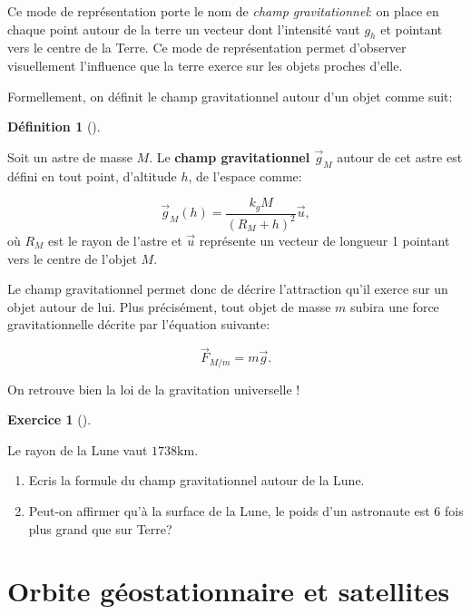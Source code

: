\documentclass[
  letterpaper,
  DIV=11,
  numbers=noendperiod]{scrartcl}
\providecommand{\tightlist}{%
  \setlength{\itemsep}{0pt}\setlength{\parskip}{0pt}}\usepackage{longtable,booktabs,array}
\theoremstyle{definition}
\newtheorem{exercise}{Exercice}[section]
\theoremstyle{definition}
\newtheorem{definition}{Définition}[section]
\theoremstyle{definition}
\theoremstyle{remark}
\begin{document}
Ce mode de représentation porte le nom de \emph{champ gravitationnel}:
on place en chaque point autour de la terre un vecteur dont l'intensité
vaut \(g_h\) et pointant vers le centre de la Terre. Ce mode de
représentation permet d'observer visuellement l'influence que la terre
exerce sur les objets proches d'elle.

Formellement, on définit le champ gravitationnel autour d'un objet comme
suit:

\begin{definition}[]\protect\hypertarget{def-champ}{}\label{def-champ}

Soit un astre de masse \(M\). Le \textbf{champ gravitationnel
\(\overrightarrow{g}_M\)} autour de cet astre est défini en tout point,
d'altitude \(h\), de l'espace comme:

\[
\overrightarrow{g}_M(h) = \frac{k_g M}{(R_M+h)^2} \overrightarrow{u},
\] où \(R_M\) est le rayon de l'astre et \(\overrightarrow{u}\)
représente un vecteur de longueur 1 pointant vers le centre de l'objet
\(M\).

\end{definition}

Le champ gravitationnel permet donc de décrire l'attraction qu'il exerce
sur un objet autour de lui. Plus précisément, tout objet de masse \(m\)
subira une force gravitationnelle décrite par l'équation suivante:

\[
\overrightarrow{F}_{M/m} = m \overrightarrow{g}.
\]

On retrouve bien la loi de la gravitation universelle !

\begin{exercise}[]\protect\hypertarget{exr-champ}{}\label{exr-champ}

Le rayon de la Lune vaut \(1738\text{km}\).

\begin{enumerate}
\def\labelenumi{\arabic{enumi}.}
\tightlist
\item
  Ecris la formule du champ gravitationnel autour de la Lune.
\item
  Peut-on affirmer qu'à la surface de la Lune, le poids d'un astronaute
  est 6 fois plus grand que sur Terre?
\end{enumerate}

\end{exercise}

\section{Orbite géostationnaire et
satellites}\label{orbite-guxe9ostationnaire-et-satellites}
\end{document}
